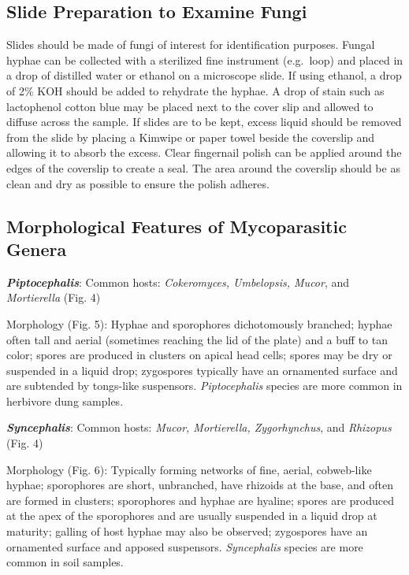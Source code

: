 \documentclass[]{book}
\begin{document}
\subsection{Slide Preparation to Examine
Fungi}\label{slide-preparation-to-examine-fungi}

Slides should be made of fungi of interest for identification purposes.
Fungal hyphae can be collected with a sterilized fine instrument
(e.g.~loop) and placed in a drop of distilled water or ethanol on a
microscope slide. If using ethanol, a drop of 2\% KOH should be added to
rehydrate the hyphae. A drop of stain such as lactophenol cotton blue
may be placed next to the cover slip and allowed to diffuse across the
sample. If slides are to be kept, excess liquid should be removed from
the slide by placing a Kimwipe or paper towel beside the coverslip and
allowing it to absorb the excess. Clear fingernail polish can be applied
around the edges of the coverslip to create a seal. The area around the
coverslip should be as clean and dry as possible to ensure the polish
adheres.

\subsection{Morphological Features of Mycoparasitic
Genera}\label{morphological-features-of-mycoparasitic-genera}

\textbf{\emph{Piptocephalis}}: Common hosts: \emph{Cokeromyces,
Umbelopsis, Mucor}, and \emph{Mortierella} (Fig. 4)

Morphology (Fig. 5): Hyphae and sporophores dichotomously branched;
hyphae often tall and aerial (sometimes reaching the lid of the plate)
and a buff to tan color; spores are produced in clusters on apical head
cells; spores may be dry or suspended in a liquid drop; zygospores
typically have an ornamented surface and are subtended by tongs-like
suspensors. \emph{Piptocephalis} species are more common in herbivore
dung samples.

\textbf{\emph{Syncephalis}}: Common hosts: \emph{Mucor, Mortierella,
Zygorhynchus}, and \emph{Rhizopus} (Fig. 4)

Morphology (Fig. 6): Typically forming networks of fine, aerial,
cobweb-like hyphae; sporophores are short, unbranched, have rhizoids at
the base, and often are formed in clusters; sporophores and hyphae are
hyaline; spores are produced at the apex of the sporophores and are
usually suspended in a liquid drop at maturity; galling of host hyphae
may also be observed; zygospores have an ornamented surface and apposed
suspensors. \emph{Syncephalis} species are more common in soil samples.
\end{document}
